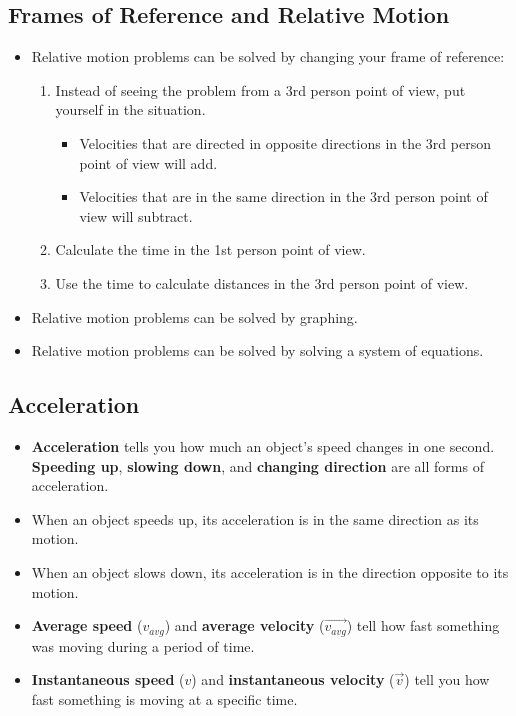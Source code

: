 \documentclass[letterpaper, 12pt]{article}
\begin{document}
\subsection*{Frames of Reference and Relative Motion}
\begin{itemize}
	\item Relative motion problems can be solved by changing your frame of reference:
		\begin{enumerate} 
			\item Instead of seeing the problem from a 3rd person point of view, put yourself in the situation.
				\begin{itemize}
					\item Velocities that are directed in opposite directions in the 3rd person point of view will add.
					\item Velocities that are in the same direction in the 3rd person point of view will subtract.
				\end{itemize}
			\item Calculate the time in the 1st person point of view.
			\item Use the time to calculate distances in the 3rd person point of view.
			
		\end{enumerate}
	\item Relative motion problems can be solved by graphing.
	\item Relative motion problems can be solved by solving a system of equations.
	
	
\end{itemize}

	
\subsection*{Acceleration}
\begin{itemize}
	\item \textbf{Acceleration} tells you how much an object's speed changes in one second. \textbf{Speeding up}, \textbf{slowing down}, and \textbf{changing direction} are all forms of acceleration.
	\item When an object speeds up, its acceleration is in the same direction as its motion.
	\item When an object slows down, its acceleration is in the direction  opposite to its motion.
	\item \textbf{Average speed} ($v_{avg}$) and \textbf{average velocity} ($\vec{v_{avg}}$) tell how fast something was moving during a period of time.
	\item \textbf{Instantaneous speed} ($v$) and \textbf{instantaneous velocity} ($\vec{v}$) tell you how fast something is moving at a specific time.
	
\end{itemize}
\end{document}

